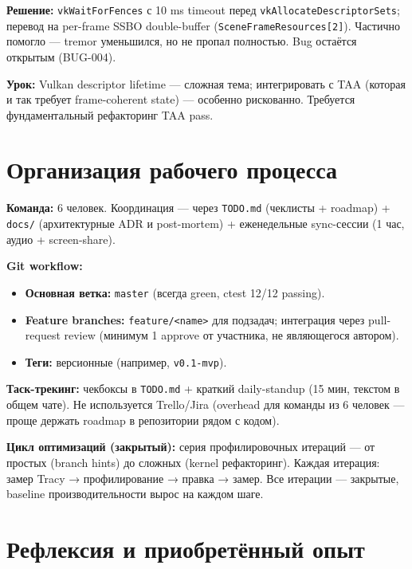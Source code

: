 \textbf{Решение:} \texttt{vkWaitForFences} с 10 ms timeout перед \texttt{vkAllocateDescriptorSets}; перевод на per-frame SSBO double-buffer (\texttt{SceneFrameResources{[}2{]}}). Частично помогло --- tremor уменьшился, но не пропал полностью. Bug остаётся открытым (BUG-004).

\textbf{Урок:} Vulkan descriptor lifetime --- сложная тема; интегрировать с TAA (которая и так требует frame-coherent state) --- особенно рискованно. Требуется фундаментальный рефакторинг TAA pass.

\section{Организация рабочего процесса}\label{KT-3.2_Final_Report-ux43eux440ux433ux430ux43dux438ux437ux430ux446ux438ux44f-ux440ux430ux431ux43eux447ux435ux433ux43e-ux43fux440ux43eux446ux435ux441ux441ux430}

\textbf{Команда:} 6 человек. Координация --- через \texttt{TODO.md} (чеклисты + roadmap) + \texttt{docs/} (архитектурные ADR и post-mortem) + еженедельные sync-сессии (1 час, аудио + screen-share).

\textbf{Git workflow:}

\begin{itemize}
\tightlist
\item
  \textbf{Основная ветка:} \texttt{master} (всегда green, ctest 12/12 passing).
\item
  \textbf{Feature branches:} \texttt{feature/\textless{}name\textgreater{}} для подзадач; интеграция через pull-request review (минимум 1 approve от участника, не являющегося автором).
\item
  \textbf{Теги:} версионные (например, \texttt{v0.1-mvp}).
\end{itemize}

\textbf{Таск-трекинг:} чекбоксы в \texttt{TODO.md} + краткий daily-standup (15 мин, текстом в общем чате). Не используется Trello/Jira (overhead для команды из 6 человек --- проще держать roadmap в репозитории рядом с кодом).

\textbf{Цикл оптимизаций (закрытый):} серия профилировочных итераций --- от простых (branch hints) до сложных (kernel рефакторинг). Каждая итерация: замер Tracy → профилирование → правка → замер. Все итерации --- закрытые, baseline производительности вырос на каждом шаге.

\section{Рефлексия и приобретённый опыт}\label{KT-3.2_Final_Report-ux440ux435ux444ux43bux435ux43aux441ux438ux44f-ux438-ux43fux440ux438ux43eux431ux440ux435ux442ux451ux43dux43dux44bux439-ux43eux43fux44bux442}

